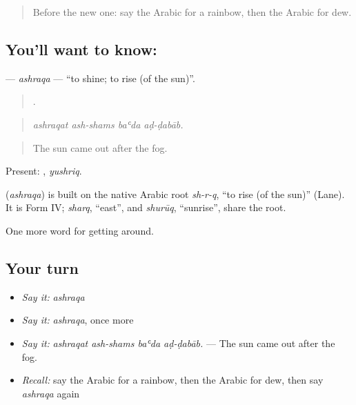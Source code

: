 \begin{quote}
Before the new one: say the Arabic for a rainbow, then the Arabic for dew.
\end{quote}

\subsection*{You'll want to know: }
\textbf{} — \emph{ashraqa} — \textquotedblleft{}to shine; to rise (of the sun)\textquotedblright{}.

\begin{quote}
   .
\end{quote}

\begin{quote}
\emph{ashraqat ash-shams baʿda aḍ-ḍabāb.}
\end{quote}

\begin{quote}
The sun came out after the fog.
\end{quote}

Present: , \emph{yushriq}.

\begin{cousinweb}
\textbf{} (\emph{ashraqa}) is built on the native Arabic root \emph{sh-r-q}, \textquotedblleft{}to rise (of the sun)\textquotedblright{} (Lane). It is Form IV; \emph{sharq}, \textquotedblleft{}east\textquotedblright{}, and \emph{shurūq}, \textquotedblleft{}sunrise\textquotedblright{}, share the root.
\end{cousinweb}

\begin{grammarlens}[title={What you've built}]
One more word for getting around.
\end{grammarlens}

\subsection*{Your turn}
\begin{itemize}
\raggedright
  \item \emph{Say it:} \emph{ashraqa}
  \item \emph{Say it:} \emph{ashraqa}, once more
  \item \emph{Say it:} \emph{ashraqat ash-shams baʿda aḍ-ḍabāb.} — The sun came out after the fog.
  \item \emph{Recall:} say the Arabic for a rainbow, then the Arabic for dew, then say \emph{ashraqa} again
\end{itemize}

